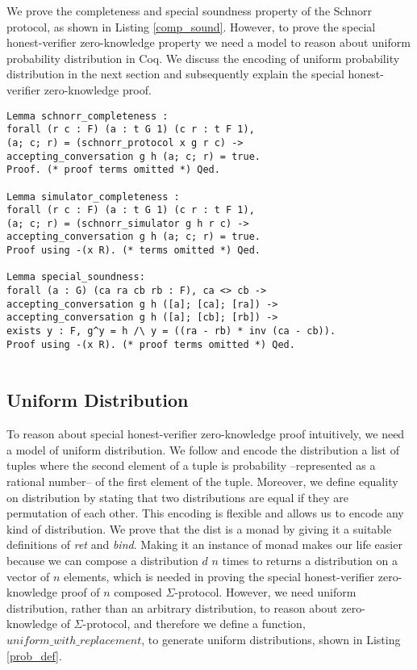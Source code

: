 \documentclass[conference,compsoc]{IEEEtran}
\begin{document}
We prove the completeness and special soundness property of the Schnorr protocol, 
as shown in Listing \ref{comp_sound}. However, to prove the special honest-verifier 
zero-knowledge property we need a model to reason about uniform probability 
distribution in Coq. We discuss the encoding of uniform probability distribution 
in the next section and subsequently explain the special honest-verifier zero-knowledge
proof. 

\begin{lstlisting}[frame=single, language=Coq, caption={Completeness and Soundness},
  label={comp_sound},captionpos=t, basicstyle=\ttfamily\footnotesize,
  abovecaptionskip=-\medskipamount]
Lemma schnorr_completeness : 
forall (r c : F) (a : t G 1) (c r : t F 1),
(a; c; r) = (schnorr_protocol x g r c) ->
accepting_conversation g h (a; c; r) = true.
Proof. (* proof terms omitted *) Qed.
  
Lemma simulator_completeness : 
forall (r c : F) (a : t G 1) (c r : t F 1),
(a; c; r) = (schnorr_simulator g h r c) ->
accepting_conversation g h (a; c; r) = true.
Proof using -(x R). (* terms omitted *) Qed. 
  
Lemma special_soundness: 
forall (a : G) (ca ra cb rb : F), ca <> cb ->
accepting_conversation g h ([a]; [ca]; [ra]) ->  
accepting_conversation g h ([a]; [cb]; [rb]) ->
exists y : F, g^y = h /\ y = ((ra - rb) * inv (ca - cb)).
Proof using -(x R). (* proof terms omitted *) Qed.
  
\end{lstlisting}
 


 
\subsection{Uniform Distribution}
To reason about special honest-verifier zero-knowledge proof 
intuitively, we need a model of uniform distribution. 
We follow \cite{erwig2006functional}  and 
encode the distribution a list of tuples where the 
second element of a tuple is probability --represented as 
a rational number-- of the first element 
of the tuple. Moreover, we define equality on distribution by 
stating that two distributions are equal if they are permutation 
of each other. This encoding is flexible and allows us 
to encode any kind of distribution. We prove that the dist is a 
monad \cite{erwig2006functional} by 
giving it a suitable definitions of \textit{ret} and 
\textit{bind}. Making it an instance of monad makes our life easier because 
we can compose a distribution $d$ $n$ times to 
returns a distribution on a vector of $n$ elements, 
which is needed in proving the special honest-verifier 
zero-knowledge proof of $n$ composed $\Sigma$-protocol.
However, we need uniform 
distribution, rather than an arbitrary distribution, to reason about 
zero-knowledge of $\Sigma$-protocol, and therefore we define a function, $uniform\_with\_replacement$, 
to generate uniform distributions, shown in Listing \ref{prob_def}.
\end{document}
